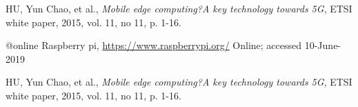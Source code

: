 \begin{thebibliography}{99}
	 HU, Yun Chao, et al., \emph{Mobile edge computing?A key technology
		towards 5G}, ETSI white paper, 2015, vol. 11, no 11, p. 1-16.
	
	@online{ Raspberry pi,
		\url{https://www.raspberrypi.org/}
		Online; accessed 10-June-2019
	}

	 HU, Yun Chao, et al., \emph{Mobile edge computing?A key technology
		towards 5G}, ETSI white paper, 2015, vol. 11, no 11, p. 1-16.		
\end{thebibliography}